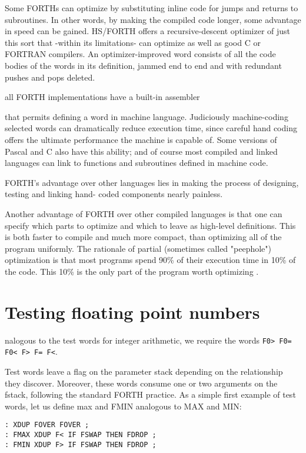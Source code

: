 Some FORTHs can optimize by substituting inline code for jumps
and returns to subroutines. In other words, by making the compiled code longer,
some advantage in speed can be gained.
HS/FORTH offers a recursive-descent optimizer of just this sort
that -within its limitations- can optimize as well as good C or
FORTRAN compilers. An optimizer-improved word consists of
all the code bodies of the words in its definition, jammed end to
end and with redundant pushes and pops deleted.

 all FORTH implementations have a built-in assembler

that permits defining a word in machine language. Judiciously
machine-coding selected words can dramatically reduce execution time, since
careful hand coding offers the ultimate performance the machine is capable of.
Some versions of Pascal and C
also have this ability; and of course most compiled and linked
languages can link to functions and subroutines defined in
machine code.

FORTH's advantage over other languages lies in making the 
process of designing, testing and linking hand- coded components
nearly painless.

Another advantage of FORTH over other compiled languages is
that one can specify which parts to optimize and which to leave
as high-level definitions. This is both faster to compile and much
more compact, than optimizing all of the program uniformly. The
rationale of partial (sometimes called "peephole") optimization
is that most programs spend 90\% of their execution time in 10\%
of the code. This 10\% is the only part of the program worth
optimizing  .

\section{Testing floating point numbers}

 nalogous to the test words for integer arithmetic, we require
the words \verb|F0> F0= F0< F> F= F<|.

Test words leave a ﬂag on the parameter stack depending on the
relationship they discover. Moreover, these words consume one
or two arguments on the fstack, following the standard FORTH
practice. As a simple first example of test words, let us define
max and FMIN analogous to MAX and MIN: 
\begin{verbatim}
: XDUP FOVER FOVER ;
: FMAX XDUP F< IF FSWAP THEN FDROP ;
: FMIN XDUP F> IF FSWAP THEN FDROP ;
\end{verbatim}

